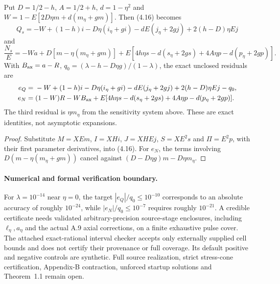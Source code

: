 \begin{proposition}
\label{prop:normalized-source-stress}
Put $D=1/2-h$, $A=1/2+h$, $d=1-\eta^2$ and
$W=1-E[2D\eta m+d(m_\eta+gm)]$. Then (4.16) becomes
\[
 Q_s=-W+(1-h)i-D\eta(i_\eta+gi)
 -dE(j_\eta+2gj)+2(h-D)\eta Ej
\]
and
\[
 \frac{N_s}{E}=-Wa+D[m-\eta(m_\eta+gm)]
 +E[4h\eta s-d(s_\eta+2gs)+4A\eta p-d(p_\eta+2gp)].
\]
With $B_{\rm ax}=a-R$, $q_0=(\lambda-h-D\eta g)/(1-\lambda)$,
the exact unclosed residuals are
\[
\begin{aligned}
e_Q={}&-W+(1-h)i-D\eta(i_\eta+gi)
 -dE(j_\eta+2gj)+2(h-D)\eta Ej-q_0,\\
e_N={}&(1-W)R-WB_{\rm ax}
 +E[4h\eta s-d(s_\eta+2gs)+4A\eta p-d(p_\eta+2gp)].
\end{aligned}
\]
The third residual is $\eta m_\eta$ from the sensitivity
system above. These are exact identities, not asymptotic expansions.
\end{proposition}
\begin{proof}
Substitute $M=XEm$, $I=XHi$, $J=XHEj$, $S=XE^2s$ and
$\Pi=E^2p$, with their first parameter derivatives, into (4.16).
For $e_N$, the terms involving $D(m-\eta(m_\eta+gm))$
cancel against $(D-D\eta g)m-D\eta m_\eta$.
\end{proof}

\paragraph{Numerical and formal verification boundary.}
For $\lambda=10^{-14}$ near $\eta=0$, the target
$|e_Q|/q_0\le10^{-10}$ corresponds to an absolute
accuracy of roughly $10^{-24}$, while
$|e_N|/q_0\le10^{-7}$ requires roughly $10^{-21}$.
A credible certificate needs validated arbitrary-precision
source-stage enclosures, including $\ell_\eta,a_\eta$ and the
actual A.9 axial corrections, on a finite exhaustive pulse
cover. The attached exact-rational interval checker accepts only
externally supplied cell bounds and does not certify their
provenance or full coverage. Its default positive and negative
controls are synthetic. Full source realization, strict
stress-cone certification, Appendix-B contraction, unforced
startup solutions and Theorem~1.1 remain open.
